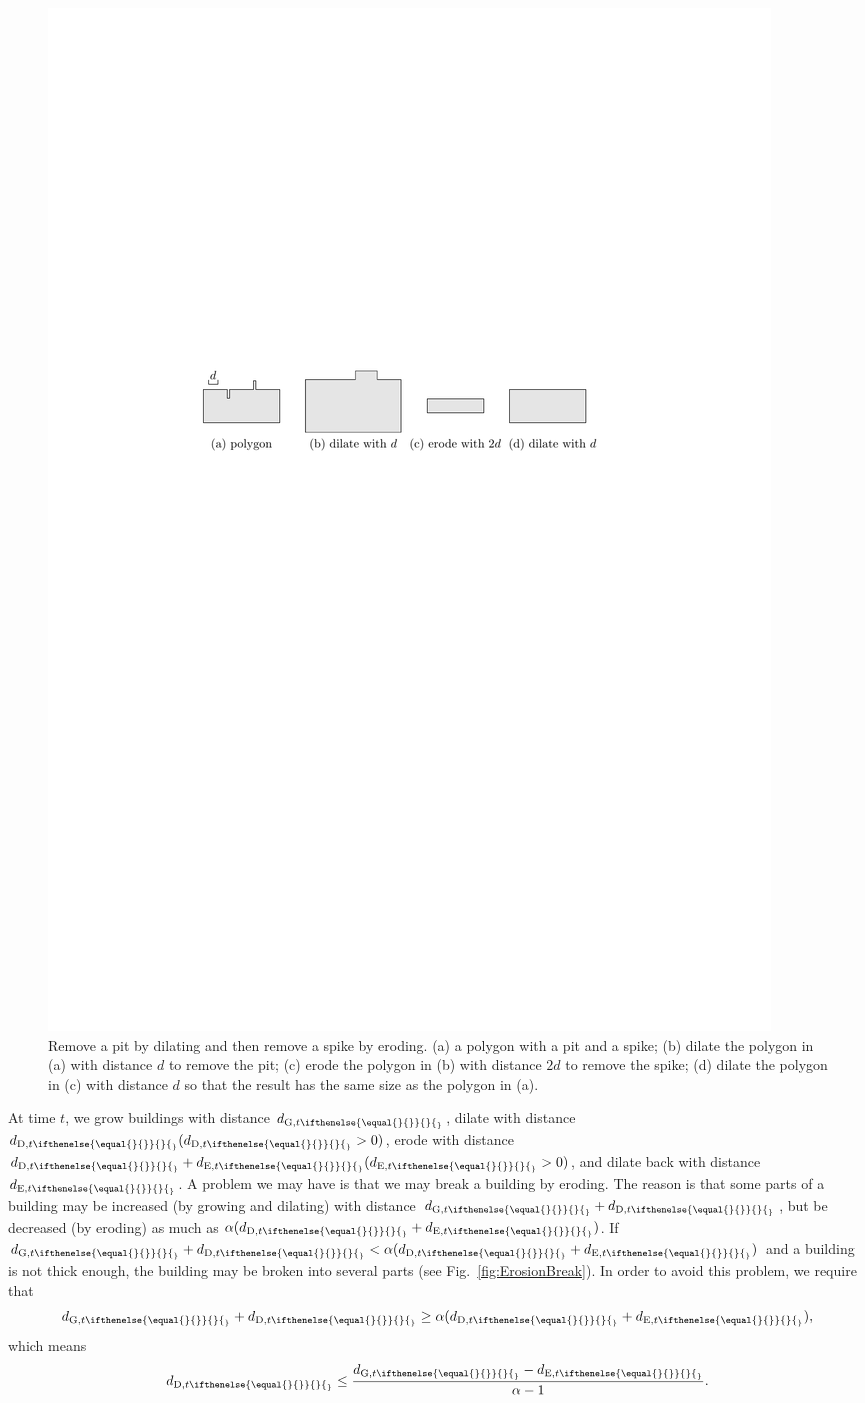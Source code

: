 \documentclass[graybox]{svmult}
\newcommand{\fig}{Fig.~}
\newcommand{\dtrm}[2][]{d_{\mathrm{#2}, t\ifthenelse{\equal{#1}{}}{}{_#1}}}
\begin{document}
\begin{figure}[tb]
	\centering
	\includegraphics[]{RemovePitAndSpike}
	\caption{Remove a pit by dilating and then remove a spike by eroding.
		(a) a polygon with a pit and a spike;
		(b) dilate the polygon in (a) with distance $d$ to remove the pit;
		(c) erode the polygon in (b) with distance $2d$ to remove the spike;
		(d) dilate the polygon in (c) with distance $d$ so that the result has 
		the same size as the polygon in (a).
	}
	\label{fig:RemovePitAndSpike}
\end{figure}

At time $t$, we grow buildings with distance $\dtrm{G}$,
dilate with distance $\dtrm{D} (\dtrm{D}>0)$,
erode with distance $\dtrm{D}+\dtrm{E} (\dtrm{E}>0)$,
and dilate back with distance $\dtrm{E}$.
A problem we may have is that we may break a building by eroding.
The reason is that 
some parts of a building may be increased (by growing and dilating) 
with distance $\dtrm{G}+\dtrm{D}$, 
but be decreased (by eroding) as much as $\alpha (\dtrm{D}+\dtrm{E})$.
If  $\dtrm{G}+\dtrm{D} < \alpha (\dtrm{D}+\dtrm{E})$ 
and a building is not thick enough, 
the building may be broken into several parts
(see \fig\ref{fig:ErosionBreak}).
In order to avoid this problem, we require that
\[
\dtrm{G} + \dtrm{D} \ge \alpha (\dtrm{D}+\dtrm{E}),
\]
which means
\begin{equation}
\label{eq:d_Dt}
\dtrm{D} \le \frac{\dtrm{G}-\dtrm{E}}{\alpha - 1}.
\end{equation}
\end{document}
